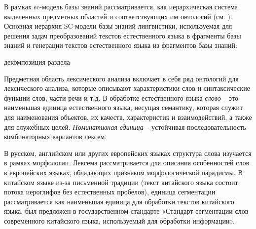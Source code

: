 В рамках  sc-модель базы знаний рассматривается, как иерархическая система выделенных предметных областей и соответствующих им онтологий (см. ). Основная иерархия SC-модели базы знаний лингвистики, используемая для решения задач преобразований текстов естественного языка в фрагменты базы знаний и генерации текстов естественного языка из фрагментов базы знаний:
\begin{SCn}
	\begin{scnrelfromset}{декомпозиция раздела}
	\end{scnrelfromset}
\end{SCn}

Предметная область лексического анализа включает в себя ряд онтологий для лексического анализа, которые описывают характеристики слов и синтаксические функции слов, части речи и т.д. В обработке естественного языка \textit{слово} -- это наименьшая единица естественного языка, несущая семантику, которая служит для наименования объектов, их качеств, характеристик и взаимодействий, а также для служебных целей. \textit{Номинативная единица} -- устойчивая последовательность комбинаторных вариантов лексем.
\begin{SCn}
\end{SCn} 

В русском, английском или других европейских языках структура слова изучается в рамках морфологии. Лексема рассматривается для описания особенностей слов в европейских языках, обладающих признаком морфологической парадигмы. В китайском языке из-за письменной традиции (текст китайского языка состоит потока иероглифов без естественных пробелов), единица сегментации рассматривается как наименьшая единица для обработки текстов китайского языка, был предложен в государственном стандарте «Стандарт сегментации слов современного китайского языка, используемый для обработки информации». 
\begin{SCn}
\end{SCn}

